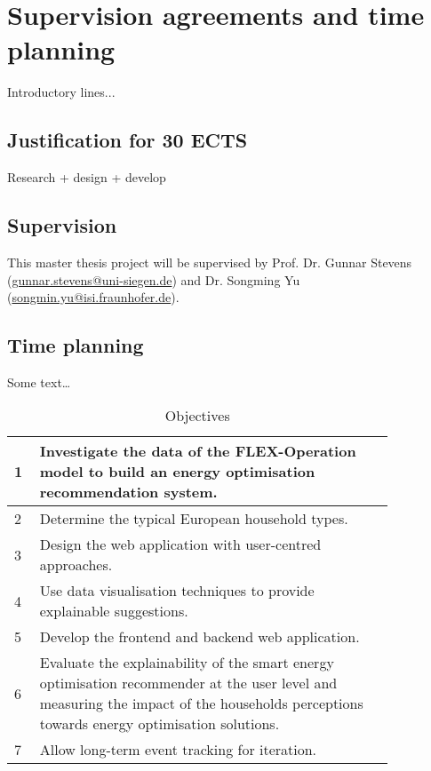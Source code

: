\chapter{Supervision agreements and time planning} 

Introductory lines...

\section{Justification for 30 ECTS}

Research + design + develop

\section{Supervision}

This master thesis project will be supervised by 
Prof. Dr. Gunnar Stevens (\href{mailto:gunnar.stevens@uni-siegen.de}{gunnar.stevens@uni-siegen.de}) and 
Dr. Songming Yu (\href{mailto:songmin.yu@isi.fraunhofer.de}{songmin.yu@isi.fraunhofer.de}).  

\section{Time planning}

Some text\dots \\

\begin{table}[h]
    \begin{center}
        \begin{tabular}{ | p{0.05\linewidth} | p{0.8\linewidth} | }
        \hline 
        1 & \cellcolor{green!10!orange}Investigate the data of the FLEX-Operation model to build an energy optimisation recommendation system. \\
        \hline 
        2 & \cellcolor{green!20!orange}Determine the typical European household types. \\
        \hline 
        3 & \cellcolor{green!30!orange}Design the web application with user-centred approaches. \\
        \hline 
        4 & \cellcolor{green!40!orange}Use data visualisation techniques to provide explainable suggestions. \\
        \hline 
        5 & \cellcolor{green!50!orange}Develop the frontend and backend web application. \\
        \hline 
        6 & \cellcolor{green!60!orange}Evaluate the explainability of the smart energy optimisation recommender at the user level and measuring the impact of the households perceptions towards energy optimisation solutions. \\
        \hline
        7 & \cellcolor{green!70!orange}Allow long-term event tracking for iteration. \\
        \hline 
        \end{tabular}
        \caption{Objectives}
        \label{tab:objectives}
    \end{center}
\end{table}

